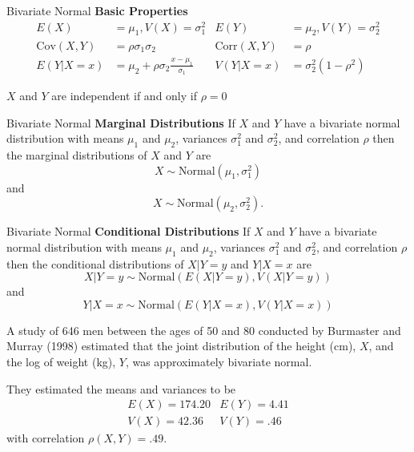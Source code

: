 \begin{frame}
  \begin{block}{Bivariate Normal}
    \textbf{Basic Properties}
    \begin{align*}
      E(X) &= \mu_1, V(X) = \sigma_1^2 &  E(Y) &=\mu_2 , V(Y) =\sigma_2^2\\
      \mbox{Cov}(X,Y) & =\rho\sigma_1\sigma_2  & \mbox{Corr}(X,Y)&=\rho\\
      E(Y|X=x)&=\mu_2 + \rho \sigma_2 \frac{x-\mu_1}{\sigma_1}
                    & V(Y|X=x)&=\sigma_2^2(1-\rho^2)
    \end{align*}
    
    \bigskip
    
    \begin{center}
      $X$ and $Y$ are independent if and only if $\rho = 0$
    \end{center}
  \end{block}
\end{frame}

\begin{frame}
  \begin{block}{Bivariate Normal}
    \textbf{Marginal Distributions}
    If $X$ and $Y$ have a bivariate normal distribution with means $\mu_1$ and $\mu_2$, variances $\sigma^2_1$ and $\sigma^2_2$, and correlation $\rho$ then the marginal distributions of $X$ and $Y$ are
    $$
    X \sim \mbox{Normal}(\mu_1,\sigma_1^2)
    $$
    and
    $$
    X \sim \mbox{Normal}(\mu_2,\sigma_2^2).
    $$
    \end{block}
\end{frame}

\begin{frame}
  \begin{block}{Bivariate Normal}
    \textbf{Conditional Distributions}
    If $X$ and $Y$ have a bivariate normal distribution with means $\mu_1$ and $\mu_2$, variances $\sigma^2_1$ and $\sigma^2_2$, and correlation $\rho$ then the conditional distributions of $X|Y=y$ and $Y|X=x$ are
    $$
    X|Y=y \sim \mbox{Normal}(E(X|Y=y),V(X|Y=y))
    $$
    and
    $$
    Y|X=x \sim \mbox{Normal}(E(Y|X=x),V(Y|X=x))
    $$
    \end{block}
\end{frame}

\begin{frame}
  \begin{block}{\example}
    A study of 646 men between the ages of 50 and 80 conducted by Burmaster and Murray (1998) estimated that the joint distribution of the height (cm), $X$, and the log of weight (kg), $Y$, was approximately bivariate normal.
    
    They estimated the means and variances to be
    \[
      \begin{array}{ll}
      E(X)=174.20   & E(Y)=4.41\\
      V(X)=42.36   & V(Y)=.46
      \end{array}
    \]
    with correlation $\rho(X,Y)=.49$. 
    
     \end{block}
\end{frame}



